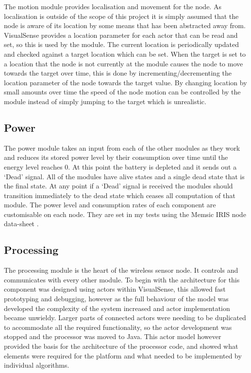 \documentclass[authoryearcitations]{UoYCSproject}
\begin{document}
The motion module provides localisation and movement for the node. As localisation is outside of the scope of this project it is simply assumed that the node is aware of its location by some means that has been abstracted away from. VisualSense provides a location parameter for each actor that can be read and set, so this is used by the module. The current location is periodically updated and checked against a target location which can be set. When the target is set to a location that the node is not currently at the module causes the node to move towards the target over time, this is done by incrementing/decrementing the location parameter of the node towards the target value. By changing location by small amounts over time the speed of the node motion can be controlled by the module instead of simply jumping to the target which is unrealistic.

\subsection{Power}

The power module takes an input from each of the other modules as they work and reduces its stored power level by their consumption over time until the energy level reaches 0. At this point the battery is depleted and it sends out a `Dead' signal. All of the modules have alive states and a single dead state that is the final state. At any point if a `Dead' signal is received the modules should transition immediately to the dead state which ceases all computation of that module. The power level and consumption rates of each component are customisable on each node. They are set in my tests using the Memsic IRIS node data-sheet \citep{Memsic2011}.

\subsection{Processing}

The processing module is the heart of the wireless sensor node. It controls and communicates with every other module. To begin with the architecture for this component was designed using actors within VisualSense, this allowed fast prototyping and debugging, however as the full behaviour of the model was developed the complexity of the system increased and actor implementation became unwieldy. Larger parts of connected actors were needing to be duplicated to accommodate all the required functionality, so the actor development was stopped and the processor was moved to Java. This actor model however provided the basis for the architecture of the processor code, and showed what elements were required for the platform and what needed to be implemented by individual algorithms.
\end{document}
